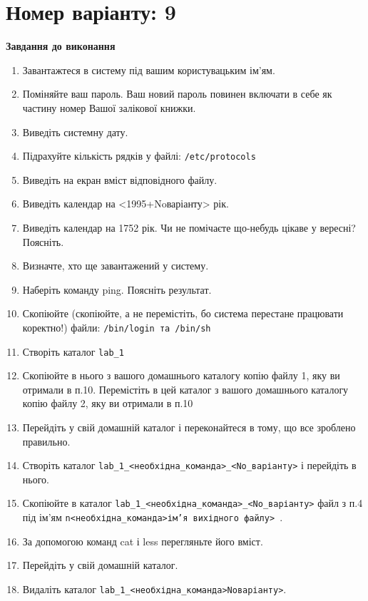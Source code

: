 \documentclass{article}
\begin{document}
\newpage
	\noindent \section*{Номер варіанту: 9}
	\indent \textbf{Завдання до виконання}
	\begin{enumerate}
		\item Завантажтеся в систему під вашим користувацьким ім'ям.
		\item Поміняйте ваш пароль. Ваш новий пароль повинен включати в себе як
		частину номер Вашої залікової книжки.
		\item Виведіть системну дату.
		\item Підрахуйте кількість рядків у файлі: 
\verb|/etc/protocols|
		\item Виведіть на екран вміст відповідного файлу.
		\item Виведіть календар на <1995+Noваріанту> рік.
		\item Виведіть календар на 1752 рік. Чи не помічаєте що-небудь цікаве у
		вересні? Поясніть.
		\item Визначте, хто ще завантажений у систему.
		\item Наберіть команду ping. Поясніть результат.
		\item Скопіюйте (скопіюйте, а не перемістіть, бо система перестане
		працювати коректно!) файли: \verb|/bin/login та /bin/sh|
		\item Створіть каталог \verb|lab_1| 
		\item Скопіюйте в нього з вашого домашнього каталогу копію файлу 1, яку
		ви отримали в п.10. Перемістіть в
		цей каталог з вашого домашнього каталогу копію файлу 2, яку ви
		отримали в п.10
		\item Перейдіть у свій домашній каталог і переконайтеся в тому, що все
		зроблено правильно.
		\item Створіть каталог \verb|lab_1_<необхідна_команда>_<No_варіанту>| і перейдіть в нього.
		\item Скопіюйте в каталог \verb|lab_1_<необхідна_команда>_<No_варіанту>| файл з п.4 під ім'ям
		\verb|n<необхідна_команда>ім’я вихідного файлу> |.
		\item За допомогою команд cat і less перегляньте його вміст.
		\item Перейдіть у свій домашній каталог.
		\item Видаліть каталог \verb|lab_1_<необхідна_команда>Noваріанту>|.
	\end{enumerate}
\clearpage
\end{document}
